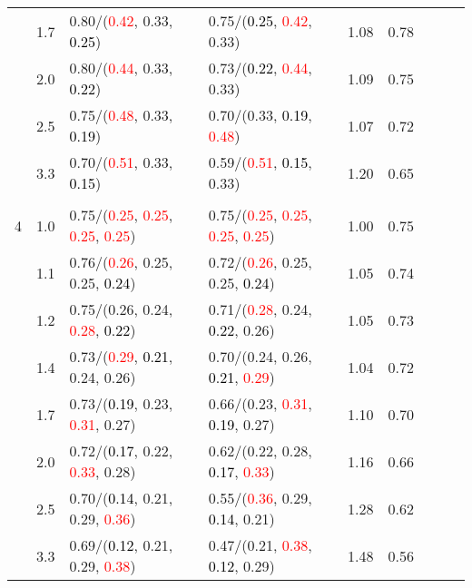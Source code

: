 \documentclass[10pt,a4paper]{report}
\begin{document}
\begin{table}[!htbp]
\begin{center}
{\begin{tabular}{ccllccccc}
			&1.7&0.80/(\textcolor{red}{0.42}, 0.33, \textcolor{black}{0.25})&0.75/(\textcolor{black}{0.25}, \textcolor{red}{0.42}, 0.33)&1.08&0.78\\
			&2.0&0.80/(\textcolor{red}{0.44}, 0.33, \textcolor{black}{0.22})&0.73/(\textcolor{black}{0.22}, \textcolor{red}{0.44}, 0.33)&1.09&0.75\\
			&2.5&0.75/(\textcolor{red}{0.48}, 0.33, \textcolor{black}{0.19})&0.70/(0.33, \textcolor{black}{0.19}, \textcolor{red}{0.48})&1.07&0.72\\
			&3.3&0.70/(\textcolor{red}{0.51}, 0.33, \textcolor{black}{0.15})&0.59/(\textcolor{red}{0.51}, \textcolor{black}{0.15}, 0.33)&1.20&0.65\\
			&&&&\\
			4			&1.0&0.75/(\textcolor{red}{0.25}, \textcolor{red}{0.25}, \textcolor{red}{0.25}, \textcolor{red}{0.25})&0.75/(\textcolor{red}{0.25}, \textcolor{red}{0.25}, \textcolor{red}{0.25}, \textcolor{red}{0.25})&1.00&0.75\\
			&1.1&0.76/(\textcolor{red}{0.26}, 0.25, 0.25, \textcolor{black}{0.24})&0.72/(\textcolor{red}{0.26}, 0.25, 0.25, \textcolor{black}{0.24})&1.05&0.74\\
			&1.2&0.75/(0.26, 0.24, \textcolor{red}{0.28}, \textcolor{black}{0.22})&0.71/(\textcolor{red}{0.28}, 0.24, \textcolor{black}{0.22}, 0.26)&1.05&0.73\\
			&1.4&0.73/(\textcolor{red}{0.29}, \textcolor{black}{0.21}, 0.24, 0.26)&0.70/(0.24, 0.26, \textcolor{black}{0.21}, \textcolor{red}{0.29})&1.04&0.72\\
			&1.7&0.73/(\textcolor{black}{0.19}, 0.23, \textcolor{red}{0.31}, 0.27)&0.66/(0.23, \textcolor{red}{0.31}, \textcolor{black}{0.19}, 0.27)&1.10&0.70\\
			&2.0&0.72/(\textcolor{black}{0.17}, 0.22, \textcolor{red}{0.33}, 0.28)&0.62/(0.22, 0.28, \textcolor{black}{0.17}, \textcolor{red}{0.33})&1.16&0.66\\
			&2.5&0.70/(\textcolor{black}{0.14}, 0.21, 0.29, \textcolor{red}{0.36})&0.55/(\textcolor{red}{0.36}, 0.29, \textcolor{black}{0.14}, 0.21)&1.28&0.62\\
			&3.3&0.69/(\textcolor{black}{0.12}, 0.21, 0.29, \textcolor{red}{0.38})&0.47/(0.21, \textcolor{red}{0.38}, \textcolor{black}{0.12}, 0.29)&1.48&0.56\\
			\bottomrule
		\end{tabular}}
	\end{center}
\end{table}
\end{document}
